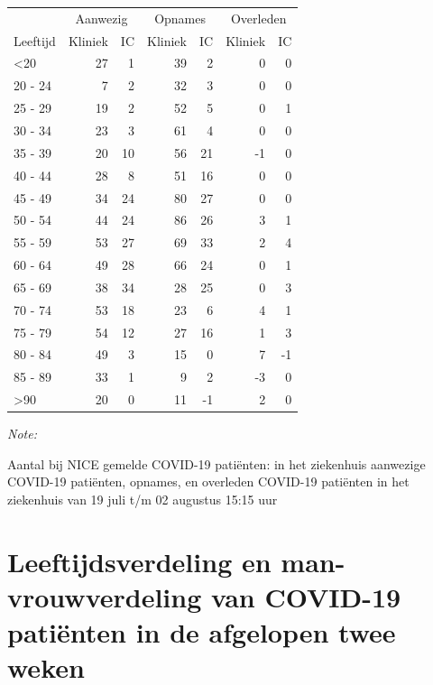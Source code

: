 \documentclass[
  english,
  man,floatsintext]{apa6}
\begin{document}
\begin{table}
\centering\begingroup\fontsize{10}{12}\selectfont

\begin{threeparttable}
\begin{tabular}{lrrrrrr}
\toprule
\multicolumn{1}{c}{ } & \multicolumn{2}{c}{Aanwezig} & \multicolumn{2}{c}{Opnames} & \multicolumn{2}{c}{Overleden} \\
\cmidrule(l{3pt}r{3pt}){2-3} \cmidrule(l{3pt}r{3pt}){4-5} \cmidrule(l{3pt}r{3pt}){6-7}
Leeftijd & Kliniek & IC & Kliniek & IC & Kliniek & IC\\
\midrule
<20 & 27 & 1 & 39 & 2 & 0 & 0\\
20 - 24 & 7 & 2 & 32 & 3 & 0 & 0\\
25 - 29 & 19 & 2 & 52 & 5 & 0 & 1\\
30 - 34 & 23 & 3 & 61 & 4 & 0 & 0\\
35 - 39 & 20 & 10 & 56 & 21 & -1 & 0\\
40 - 44 & 28 & 8 & 51 & 16 & 0 & 0\\
45 - 49 & 34 & 24 & 80 & 27 & 0 & 0\\
50 - 54 & 44 & 24 & 86 & 26 & 3 & 1\\
55 - 59 & 53 & 27 & 69 & 33 & 2 & 4\\
60 - 64 & 49 & 28 & 66 & 24 & 0 & 1\\
65 - 69 & 38 & 34 & 28 & 25 & 0 & 3\\
70 - 74 & 53 & 18 & 23 & 6 & 4 & 1\\
75 - 79 & 54 & 12 & 27 & 16 & 1 & 3\\
80 - 84 & 49 & 3 & 15 & 0 & 7 & -1\\
85 - 89 & 33 & 1 & 9 & 2 & -3 & 0\\
>90 & 20 & 0 & 11 & -1 & 2 & 0\\
\bottomrule
\end{tabular}
\begin{tablenotes}
\item \textit{Note: } 
\item Aantal bij NICE gemelde COVID-19 patiënten: in het ziekenhuis aanwezige COVID-19 patiënten, opnames, en overleden COVID-19 patiënten in het ziekenhuis van 19 juli t/m 02 augustus 15:15 uur
\end{tablenotes}
\end{threeparttable}
\endgroup{}
\end{table}

\newpage

\hypertarget{leeftijdsverdeling-en-man-vrouwverdeling-van-covid-19-patiuxebnten-in-de-afgelopen-twee-weken}{%
\section{Leeftijdsverdeling en man-vrouwverdeling van COVID-19 patiënten in de afgelopen twee weken}\label{leeftijdsverdeling-en-man-vrouwverdeling-van-covid-19-patiuxebnten-in-de-afgelopen-twee-weken}}
\end{document}
